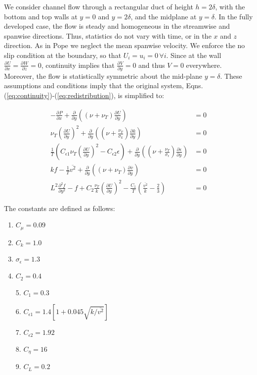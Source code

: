 \documentclass[a4paper,11pt]{article}
\newcommand{\pderiv}[3][]{%
  \ensuremath{\frac{\partial^{#1} {#2}}{\partial {#3}^{#1}}}}
\newcommand{\ep}{\epsilon}
\begin{document}
We consider channel flow through a rectangular duct of height $h= 2\delta$, with
the bottom and top walls at $y=0$ and $y=2\delta$, and the midplane at
$y=\delta$. In the fully developed case, the flow is steady and homogeneous in
the streamwise and spanwise directions. Thus, statistics do not vary with time,
or in the $x$ and $z$ direction. As in Pope \cite{pope} we neglect the mean spanwise
velocity.  We enforce the no slip condition at the boundary, so that
$U_i=u_i=0 \, \forall i$. Since at the wall
$\pderiv{U}{x}=\pderiv{W}{z} = 0$, continuity implies that
$\pderiv{V}{y}=0$ and thus $V=0$ everywhere. Moreover, the flow is statistically
symmetric about the mid-plane $y = \delta$. These assumptions and conditions
imply that the original system, Eqns.
(\ref{eq:continuity})-(\ref{eq:redistribution}), is simplified to: 

\begin{align}
	\label{eq:ssv2f1}
        -\pderiv{P}{x} +
\pderiv{}{y}\left((\nu+\nu_T)\pderiv{U}{y}\right) &= 0\\
        \nu_T\left(\pderiv{U}{y}\right)^2 + 
\pderiv{}{y}\left((\nu+\frac{\nu_T}{\sigma_k})\pderiv{k}{y}\right) &=0\\
        \frac{1}{T}\left(C_{\ep
1}\nu_T\left(\pderiv{U}{y}\right)^2 - C_{\ep 2}\ep\right) + 
\pderiv{}{y}\left((\nu+\frac{\nu_T}{\sigma_\ep})\pderiv{\ep}{y}\right) &=0 \\
         kf - \frac{1}{T}\overline{v^2} +
\pderiv{}{y}\left((\nu+\nu_T)\pderiv{\overline{v}}{y}\right) &=0 \\
         L^2\frac{\partial^2 f}{\partial y^2} -f  +
C_2\frac{\nu_T}{k}\left(\pderiv{U}{y}\right)^2 -
\frac{C_1}{T}\left(\frac{\overline{v^2}}{k}-\frac{2}{3}\right) &=0
	\label{eq:ssv2f5}
\end{align}

The constants are defined as follows: 
\begin{multicols}{2}
\begin{enumerate}
	\item $C_\mu = 0.09$
        \item $C_k = 1.0$
	\item $\sigma_\ep = 1.3$
	\item $C_2 = 0.4$	
\end{enumerate}
\columnbreak 

\begin{itemize}
	\item[5.] $C_1 = 0.3$
	\item[6.] $C_{\ep 1} = 1.4[1 + 0.045 \sqrt{k/\overline{v^2}}]$
	\item[7.] $C_{\ep 2} = 1.92$  
	\item[8.] $C_\eta = 16$
	\item[9.] $C_L = 0.2$
\end{itemize}
\end{multicols}
\end{document}
